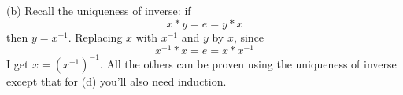 

(b)
Recall the uniqueness of inverse:
if
\[
x * y = e = y * x
\]
then $y = x^{-1}$.
Replacing $x$ with $x^{-1}$ and $y$ by $x$, since
\[
x^{-1} * x = e = x * x^{-1} 
\]
I get $x = (x^{-1})^{-1}$.
All the others can be proven using the uniqueness of inverse
except that for (d) you'll also need induction.
